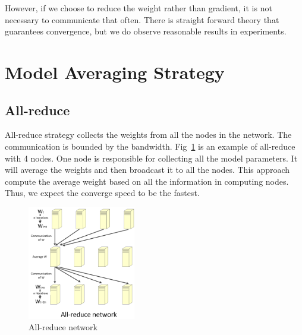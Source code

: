 \documentclass{article}
\begin{document}
However, if we choose to reduce the weight rather than gradient, it is not necessary to communicate that often. There
is straight forward theory that guarantees convergence, but we do observe reasonable results in experiments.


\section{Model Averaging Strategy}
\subsection{All-reduce}
All-reduce strategy collects the weights from all the nodes in the network. The communication is bounded by 
the bandwidth. Fig~\ref{fig:allreduce} is an example of all-reduce with 4 nodes. One node is responsible for
collecting all the model parameters. It will average the weights and then broadcast it to all the nodes. 
This approach compute the average weight based on all the information in computing nodes. Thus, we expect 
the converge speed to be the fastest.
\begin{figure}[htb]
  \centering
  \includegraphics[width=0.42\textwidth]{allreduce.jpg}
  \caption{All-reduce network}
  \label{fig:allreduce}
\end{figure}
\end{document}
